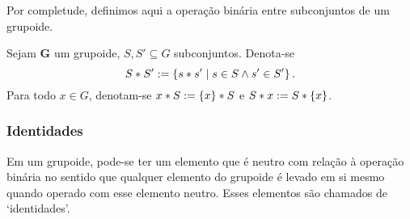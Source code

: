 Por completude, definimos aqui a operação binária entre subconjuntos de um grupoide.

\begin{definition}
Sejam $\bm G$ um grupoide, $S,S' \subseteq G$ subconjuntos. Denota-se
	\begin{equation*}
	S \ast S' := \left\{{s \ast s'}\;\middle\vert\;{s \in S \land s' \in S'}\right\}.
	\end{equation*}
Para todo $x \in G$, denotam-se $x \ast S := \{x\} \ast S$ e $S \ast x := S \ast \{x\}$.
\end{definition}

\subsubsection{Identidades}

Em um grupoide, pode-se ter um elemento que é neutro com relação à operação binária no sentido que qualquer elemento do grupoide é levado em si mesmo quando operado com esse elemento neutro. Esses elementos são chamados de `identidades'.

\begin{comment}
\begin{definition}[Identidade]
Seja $\bm G=(G,\opb)$ um grupoide.
	\begin{itemize}
	\item Uma \emph{identidade à esquerda} de $\bm G$ é um elemento $\id \in G$ que satisfaz, para todo $x \in G$,
		\begin{equation*}
		\id \opb x = x;
		\end{equation*}
	\item Uma \emph{identidade à direita} de $\bm G$ é um elemento $\id \in G$ que satisfaz, para todo $x \in G$,
		\begin{equation*}
		x \opb \id = x;
		\end{equation*}
	\item Uma \emph{identidade} de $\bm G$ é um elemento $\id \in G$ que satisfaz, para todo $x \in G$,
		\begin{equation*}
		\id \opb x = x = x \opb \id.
		\end{equation*}
	\end{itemize}
\end{definition}
\end{comment}

